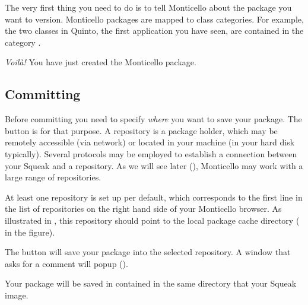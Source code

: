 \documentclass[a4paper,10pt,twoside]{book}
\begin{document}
The very first thing you need to do is to tell Monticello about the package you want to version. Monticello packages are mapped to class categories. For example, the two classes in Quinto, the first application you have seen, are contained in the category . 


\emph{Voil\`a!} You have just created the  Monticello package. 


\subsection{Committing}

Before committing you need to specify \emph{where} you want to save your package. The  button is for that purpose. A repository is a package holder, which may be remotely accessible (via network) or located in your machine (in your hard disk typically). Several protocols may be employed to establish a connection between your Squeak and a repository. As we will see later (), Monticello may work with a large range of repositories.


At least one repository is set up per default, which corresponds to the first line in the list of repositories on the right hand side of your Monticello browser. As illustrated in , this repository should point to the local package cache directory ( in the figure).

The  button will save your package into the selected repository. A window that asks for a comment will popup ().


Your package will be saved in  contained in the same directory that your Squeak image.
\end{document}
